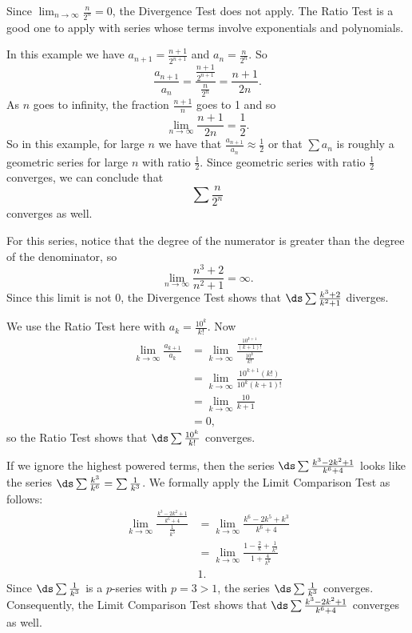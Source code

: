 \begin{activitySolution}
\ba
	\item Since $\lim_{n \to \infty} \frac{n}{2^n} = 0$, the Divergence Test does not apply. The Ratio Test is a good one to apply with series whose terms involve exponentials and polynomials.

In this example we have $a_{n+1} = \frac{n+1}{2^{n+1}}$ and $a_n = \frac{n}{2^n}$. So
\[\frac{a_{n+1}}{a_n} = \frac{\frac{n+1}{2^{n+1}}}{\frac{n}{2^n}} = \frac{n+1}{2n}.\]
As $n$ goes to infinity, the fraction $\frac{n+1}{n}$ goes to 1 and so
\[\lim_{n \to \infty} \frac{n+1}{2n} = \frac{1}{2}.\]
So in this example, for large $n$ we have that $\frac{a_{n+1}}{a_n} \approx \frac{1}{2}$ or that $\sum a_n$ is roughly a geometric series for large $n$ with ratio $\frac{1}{2}$. Since geometric series with ratio $\frac{1}{2}$ converges, we can conclude that
\[\sum \frac{n}{2^n}\]
converges as well.

\item For this series, notice that the degree of the numerator is greater than the degree of the denominator, so
\[\lim_{n \to \infty} \frac{n^3+2}{n^2+1} = \infty.\]
Since this limit is not 0, the Divergence Test shows that $\ds \sum \frac{k^3+2}{k^2+1}$ diverges.

\item We use the Ratio Test here with $a_k = \frac{10^k}{k!}$. Now
\begin{align*}
\lim_{k \to \infty} \frac{a_{k+1}}{a_k} &= \lim_{k \to \infty} \frac{ \frac{10^{k+1}}{(k+1)!} }{ \frac{10^k}{k!} } \\
    &= \lim_{k \to \infty} \frac{10^{k+1}(k!)}{10^k(k+1)!} \\
    &= \lim_{k \to \infty} \frac{10}{k+1} \\
    &= 0,
\end{align*}
so the Ratio Test shows that $\ds \sum \frac{10^k}{k!}$ converges.

\item If we ignore the highest powered terms, then the series $\ds \sum \frac{k^3-2k^2+1}{k^6+4}$ looks like the series $\ds \sum \frac{k^3}{k^6} = \sum \frac{1}{k^3}$. We formally apply the Limit Comparison Test as follows:
\begin{align*}
\lim_{k \to \infty} \frac{ \frac{k^3-2k^2+1}{k^6+4} }{  \frac{1}{k^3} } &= \lim_{k \to \infty} \frac{k^6-2k^5+k^3}{k^6+4} \\
    &= \lim_{k \to \infty} \frac{1 - \frac{2}{k} + \frac{1}{k^3}}{1 + \frac{4}{k^6}} \\
    & 1.
\end{align*}
Since $\ds \sum \frac{1}{k^3}$ is a $p$-series with $p=3>1$, the series $\ds \sum \frac{1}{k^3}$ converges. Consequently, the Limit Comparison Test shows that $\ds \sum \frac{k^3-2k^2+1}{k^6+4}$ converges as well. 

\ea
\end{activitySolution}
\aftera 